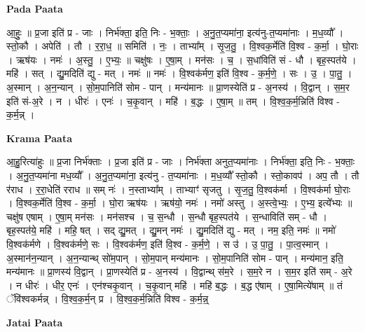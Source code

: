 \documentclass[17pt]{extarticle}
\begin{document}
\textbf{Pada Paata} \newline

आ॒हुः॒ ॥ प्र॒जा इति॑ प्र - जाः । निर्भ॑क्ता॒ इति॒ निः - भ॒क्ताः॒ । अ॒नु॒त॒प्यमा॑ना॒ इत्य॑नु-त॒प्यमा॑नाः । म॒ध॒व्यौ᳚ । स्तो॒कौ । अपेति॑ । तौ । र॒रा॒ध॒ ॥ समिति॑ । नः॒ । ताभ्या᳚म् । सृ॒ज॒तु॒ । वि॒श्वक॒र्मेति॑ वि॒श्व - क॒र्मा॒ । घो॒राः । ऋष॑यः । नमः॑ । अ॒स्तु॒ । ए॒भ्यः॒ ॥ चक्षु॑षः । ए॒षा॒म् । मन॑सः । च॒ । स॒धांविति॑ सं - धौ । बृह॒स्पत॑ये । महि॑ । सत् । द्यु॒मदिति॑ द्यु - मत् । नमः॑ ॥ नमः॑ । वि॒श्वक॑र्मण॒ इति॑ वि॒श्व - क॒र्म॒णे॒ । सः । उ॒ । पा॒तु॒ । अ॒स्मान् । अ॒न॒न्यान् । सो॒म॒पानिति॑ सोम - पान् । मन्य॑मानः ॥ प्रा॒णस्येति॑ प्र - अ॒नस्य॑ । वि॒द्वान् । स॒म॒र इति॑ सं-अ॒रे । न । धीरः॑ । एनः॑ । च॒कृ॒वान् । महि॑ । ब॒द्धः । ए॒षा॒म् ॥ तम् । वि॒श्व॒क॒र्म॒न्निति॑ विश्व - क॒र्म॒न्न् ।  \newline


\textbf{Krama Paata} \newline

आ॒हु॒रित्या॑हुः ॥ प्र॒जा निर्भ॑क्ताः । प्र॒जा इति॑ प्र - जाः । निर्भ॑क्ता अनुत॒प्यमा॑नाः । निर्भ॑क्ता॒ इति॒ निः - भ॒क्ताः॒ । अ॒नु॒त॒प्यमा॑ना मध॒व्यौ᳚ । अ॒नु॒त॒प्यमा॑ना॒ इत्य॑नु - त॒प्यमा॑नाः । म॒ध॒व्यौ᳚ स्तो॒कौ । स्तो॒कावप॑ । अप॒ तौ । तौ र॑राध । र॒रा॒धेति॑ रराध ॥ सम् नः॑ । न॒स्ताभ्या᳚म् । ताभ्याꣳ॑ सृजतु । सृ॒ज॒तु॒ वि॒श्वक॑र्मा । वि॒श्वक॑र्मा घो॒राः । वि॒श्वक॒र्मेति॑ वि॒श्व - क॒र्मा॒ । घो॒रा ऋष॑यः । ऋष॑यो॒ नमः॑ । नमो॑ अस्तु । अ॒स्त्वे॒भ्यः॒ । ए॒भ्य॒ इत्ये᳚भ्यः ॥ चक्षु॑ष एषाम् । ए॒षा॒म् मन॑सः । मन॑सश्च । च॒ स॒न्धौ । स॒न्धौ बृह॒स्पत॑ये । स॒न्धाविति॑ सम् - धौ । बृह॒स्पत॑ये॒ महि॑ । महि॒ षत् । सद् द्यु॒मत् । द्यु॒मन् नमः॑ । द्यु॒मदिति॑ द्यु - मत् । नम॒ इति॒ नमः॑ ॥ नमो॑ वि॒श्वक॑र्मणे । वि॒श्वक॑र्मणे॒ सः । वि॒श्वक॑र्मण॒ इति॑ वि॒श्व - क॒र्म॒णे॒ । स उ॑ । उ॒ पा॒तु॒ । पा॒त्व॒स्मान् । अ॒स्मान॑न॒न्यान् । अ॒न॒न्यान्थ् सो॑म॒पान् । सो॒म॒पान् मन्य॑मानः । सो॒म॒पानिति॑ सोम - पान् । मन्य॑मान॒ इति॒ मन्य॑मानः ॥ प्रा॒णस्य॑ वि॒द्वान् । प्रा॒णस्येति॑ प्र - अ॒नस्य॑ । वि॒द्वान्थ् स॑म॒रे । स॒म॒रे न । स॒म॒र इति॑ सम् - अ॒रे । न धीरः॑ । धीर॒ एनः॑ । एन॑श्चकृ॒वान् । च॒कृ॒वान् महि॑ । महि॑ ब॒द्धः । ब॒द्ध ए॑षाम् । ए॒षा॒मित्ये॑षाम् ॥ तं ॅवि॑श्वकर्मन्न् । वि॒श्व॒क॒र्म॒न् प्र । वि॒श्व॒क॒र्म॒न्निति॑ विश्व - क॒र्म॒न्न्॒ \newline

\textbf{Jatai Paata} \newline
\end{document}
